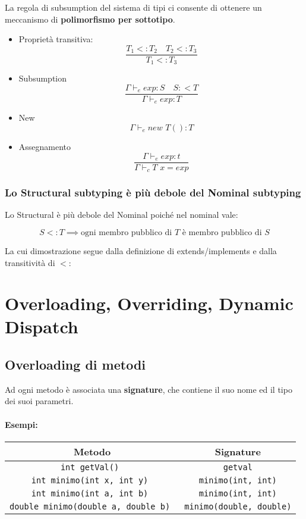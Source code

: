 \documentclass[a4paper,10pt]{article}
\begin{document}
La regola di subsumption del sistema di tipi ci consente di ottenere un meccanismo di \textbf{polimorfismo per sottotipo}.
\begin{multicols}{2}
 
\begin{itemize}
 \item Proprietà transitiva:
 \[ \dfrac{T_1 <: T_2\quad T_2 <: T_3}{T_1 <: T_3} \]

 \item Subsumption
 \[ \dfrac{\Gamma \vdash_e exp : S \quad S :<T }{\Gamma \vdash_e exp : T}\]
 \item New
 \[ \Gamma \vdash_e new \,\,T() : T \]
 \item Assegnamento
 \[ \dfrac{\Gamma \vdash_e exp : t}{\Gamma \vdash_c T\,\, x = exp} \]
\end{itemize}

\end{multicols}

\subsubsection{Lo Structural subtyping è più debole del Nominal subtyping}

Lo Structural è più debole del Nominal poiché nel nominal vale:

\[ S <: T \implies \text{ogni membro pubblico di $T$ è membro pubblico di $S$} \]

La cui dimostrazione segue dalla definizione di extends/implements e dalla transitività di $<:$


\newpage
\section{Overloading, Overriding, Dynamic Dispatch}
\subsection{Overloading di metodi}
Ad ogni metodo è associata una \textbf{signature}, che contiene il suo nome ed il tipo dei suoi parametri.

\paragraph{Esempi:} 
\begin{center}
 
\begin{tabular}{|c|c|}
\hline
\bf Metodo & \bf Signature\\
\hline
\tt int getVal() & \tt getval\\
\hline
\tt int minimo(int x, int y) &\tt  minimo(int, int)\\
\hline
\tt int minimo(int a, int b) &\tt  minimo(int, int)\\
\hline
\tt double minimo(double a, double b) &\tt  minimo(double, double)\\
\hline
\end{tabular}

\end{center}
\end{document}
